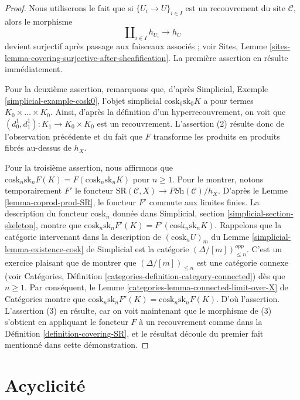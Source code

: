 \begin{proof}
Nous utiliserons le fait que si
$\{U_i \to U\}_{i \in I}$ est un recouvrement du site
$\mathcal{C}$, alors le morphisme
$$
\amalg_{i \in I} h_{U_i} \to h_U
$$
devient surjectif après passage aux faisceaux associés ; voir
Sites, Lemme \ref{sites-lemma-covering-surjective-after-sheafification}.
La première assertion en résulte immédiatement.

\medskip\noindent
Pour la deuxième assertion, remarquons que, d'après
Simplicial, Exemple \ref{simplicial-example-cosk0},
l'objet simplicial $\text{cosk}_0 \text{sk}_0 K$
a pour termes $K_0 \times \ldots \times K_0$. Ainsi,
d'après la définition d'un hyperrecouvrement,
on voit que $(d^1_0, d^1_1) : K_1 \to K_0 \times K_0$ est un
recouvrement. L'assertion (2) résulte donc de l'observation précédente
et du fait que $F$ transforme les produits en produits
fibrés au-dessus de $h_X$.

\medskip\noindent
Pour la troisième assertion, nous affirmons que
$\text{cosk}_n \text{sk}_n F(K) =
F(\text{cosk}_n \text{sk}_n K)$ pour $n \geq 1$.
Pour le montrer, notons temporairement $F'$ le foncteur
$\text{SR}(\mathcal{C}, X) \to \textit{PSh}(\mathcal{C})/h_X$.
D'après le Lemme \ref{lemma-coprod-prod-SR}, le foncteur
$F'$ commute aux limites finies.
La description du foncteur $\text{cosk}_n$ donnée dans
Simplicial, section \ref{simplicial-section-skeleton},
montre que $\text{cosk}_n \text{sk}_n F'(K) =
F'(\text{cosk}_n \text{sk}_n K)$.
Rappelons que la catégorie intervenant dans la description de
$(\text{cosk}_n U)_m$ du
Lemme \ref{simplicial-lemma-existence-cosk} de Simplicial
est la catégorie $(\Delta/[m])^{opp}_{\leq n}$. C'est un
exercice plaisant que de montrer que $(\Delta/[m])_{\leq n}$ est
une catégorie connexe (voir
Catégories, Définition \ref{categories-definition-category-connected})
dès que $n \geq 1$. Par conséquent, le
Lemme \ref{categories-lemma-connected-limit-over-X} de Catégories
montre que $\text{cosk}_n \text{sk}_n F'(K) =
\text{cosk}_n \text{sk}_n F(K)$. D'où l'assertion.
L'assertion (3) en résulte, car on voit maintenant que
le morphisme de (3) s'obtient en appliquant le
foncteur $F$ à un recouvrement comme dans la Définition \ref{definition-covering-SR},
et le résultat découle du premier fait mentionné
dans cette démonstration.
\end{proof}



\section{Acyclicité}
\label{section-acyclicity}


